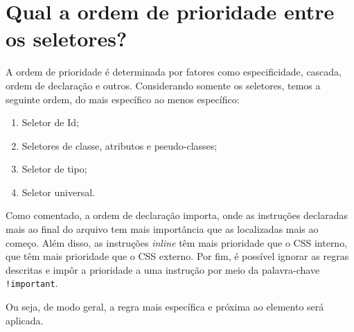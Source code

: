 \section{Qual a ordem de prioridade entre os seletores?}
A ordem de prioridade é determinada por fatores como especificidade, cascada, ordem de declaração e outros. Considerando somente os seletores, temos a seguinte ordem, do mais específico ao menos específico:
\begin{enumerate}
  \item Seletor de Id;
  \item Seletores de classe, atributos e pseudo-classes;
  \item Seletor de tipo;
  \item Seletor universal.
\end{enumerate}

Como comentado, a ordem de declaração importa, onde as instruções declaradas mais ao final do arquivo tem mais importância que as localizadas mais ao começo. Além disso, as instruções \textit{inline} têm mais prioridade que o CSS interno, que têm mais prioridade que o CSS externo. Por fim, é possível ignorar as regras descritas e impôr a prioridade a uma instrução por meio da palavra-chave \texttt{!important}.

Ou seja, de modo geral, a regra mais específica e próxima ao elemento será aplicada.
